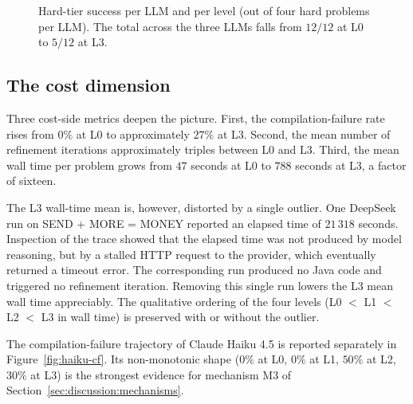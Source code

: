 \documentclass[11pt,a4paper]{article}
\begin{document}
\begin{figure}[H]
\centering
{}
\caption{Hard-tier success per LLM and per level (out of four hard problems per LLM). The total across the three LLMs falls from $12/12$ at L0 to $5/12$ at L3.}
\label{fig:hard}
\end{figure}

\subsection{The cost dimension}\label{sec:results:cost}
Three cost-side metrics deepen the picture. First, the compilation-failure rate rises from $0\%$ at L0 to approximately $27\%$ at L3. Second, the mean number of refinement iterations approximately triples between L0 and L3. Third, the mean wall time per problem grows from $47$ seconds at L0 to $788$ seconds at L3, a factor of sixteen.

The L3 wall-time mean is, however, distorted by a single outlier. One DeepSeek run on SEND + MORE = MONEY reported an elapsed time of $21\,318$ seconds. Inspection of the trace showed that the elapsed time was not produced by model reasoning, but by a stalled HTTP request to the provider, which eventually returned a timeout error. The corresponding run produced no Java code and triggered no refinement iteration. Removing this single run lowers the L3 mean wall time appreciably. The qualitative ordering of the four levels (L0 $<$ L1 $<$ L2 $<$ L3 in wall time) is preserved with or without the outlier.

The compilation-failure trajectory of Claude Haiku 4.5 is reported separately in Figure~\ref{fig:haiku-cf}. Its non-monotonic shape ($0\%$ at L0, $0\%$ at L1, $50\%$ at L2, $30\%$ at L3) is the strongest evidence for mechanism M3 of Section~\ref{sec:discussion:mechanisms}.
\end{document}
